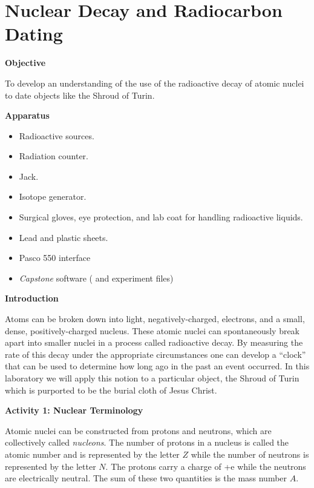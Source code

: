 
\section{Nuclear Decay and Radiocarbon Dating}

\makelabheader %

\bigskip
\textbf{Objective}

To develop an understanding of the use of the radioactive decay of
atomic nuclei to date objects like the Shroud of Turin.

\textbf{Apparatus}

\begin{itemize}[nosep]

\item Radioactive sources.
\item Radiation counter.
\item Jack.
\item Isotope generator.
\item Surgical gloves, eye protection, and lab coat for handling radioactive liquids.
\item Lead and plastic sheets.
\item Pasco 550 interface
\item \textit{Capstone} software ( and  experiment files)

\end{itemize}

\textbf{Introduction}

Atoms can be broken down into light, negatively-charged, electrons,
and a small, dense, positively-charged nucleus. These atomic nuclei
can spontaneously break apart into smaller nuclei in a process called
radioactive decay. By measuring the rate of this decay under the appropriate
circumstances one can develop a {}``clock'' that can be used to
determine how long ago in the past an event occurred. In this laboratory
we will apply this notion to a particular object, the Shroud of Turin
which is purported to be the burial cloth of Jesus Christ.

\textbf{Activity 1: Nuclear Terminology }

Atomic nuclei can be constructed from protons and neutrons, which are collectively called \emph{nucleons}. The number
of protons in a nucleus is called the atomic number and is represented
by the letter $Z$ while the number of neutrons is represented by the
letter $N$. The protons carry a charge of +e while the neutrons are
electrically neutral. The sum of these two quantities is the mass
number $A$.

